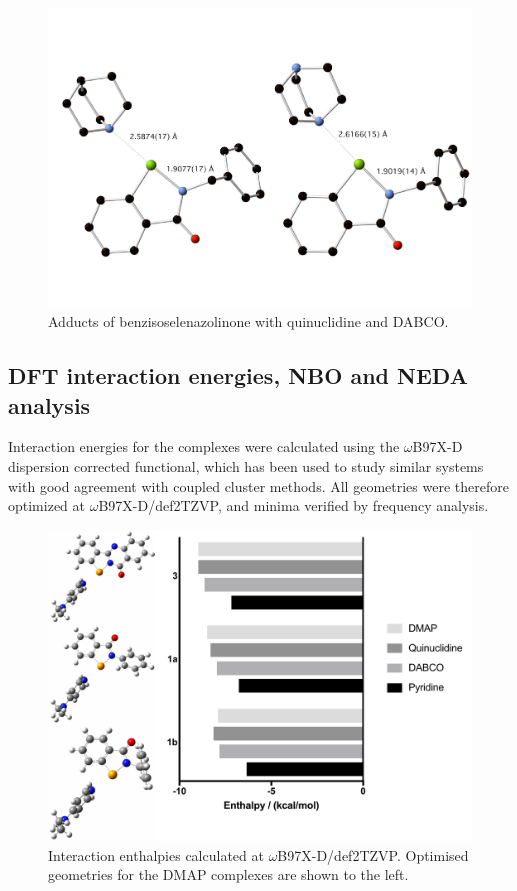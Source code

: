 \begin{figure}
  \centering
  \includegraphics[width=0.8\linewidth]{fig/benzyl-quin-dabco-xray.pdf}
  \caption{Adducts of benzisoselenazolinone  with quinuclidine and DABCO.}
  \label{fig:benzyl-adducts}
\end{figure}

\subsection{DFT interaction energies, NBO and NEDA analysis}
Interaction energies for the complexes were calculated using the $\omega$B97X-D dispersion corrected functional, which has been used to study similar systems with good agreement with coupled cluster methods.\autocite{Oliveira2017}
All geometries were therefore optimized at $\omega$B97X-D/def2TZVP, and minima verified by frequency analysis.

\begin{figure}
  \centering
  \includegraphics[width=0.8\linewidth]{fig/dft-energies.pdf}
  \caption[Interaction energies for various complexes.]{Interaction enthalpies calculated at $\omega$B97X-D/def2TZVP. Optimised geometries for the DMAP complexes are shown to the left.}
\end{figure}

